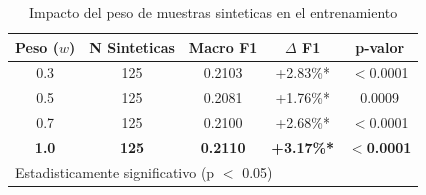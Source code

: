 \begin{table}[h]
\centering
\caption{Impacto del peso de muestras sinteticas en el entrenamiento}
\label{tab:weight_validation}
\begin{tabular}{ccccc}
\hline
Peso ($w$) & N Sinteticas & Macro F1 & $\Delta$ F1 & p-valor \\
\hline
0.3 & 125 & 0.2103 & +2.83\%* & $<$0.0001 \\
0.5 & 125 & 0.2081 & +1.76\%* & 0.0009 \\
0.7 & 125 & 0.2100 & +2.68\%* & $<$0.0001 \\
\textbf{1.0} & \textbf{125} & \textbf{0.2110} & \textbf{+3.17\%*} & $<$\textbf{0.0001} \\
\hline
\multicolumn{5}{l}{\footnotesize *Estadisticamente significativo (p $<$ 0.05)} \\
\end{tabular}
\end{table}
